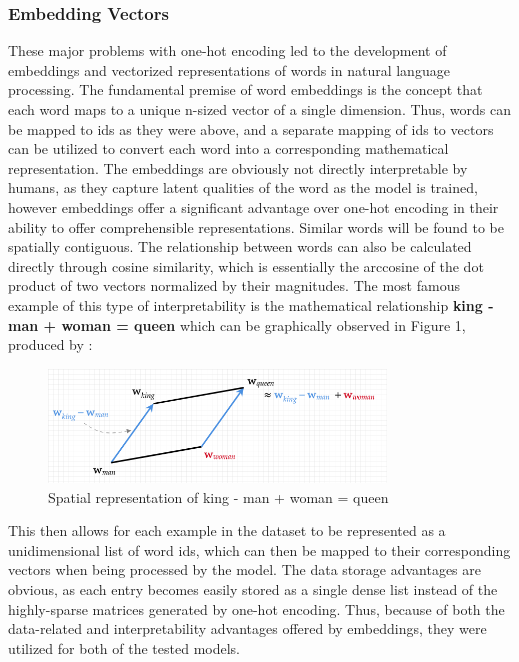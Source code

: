 \subsubsection{Embedding Vectors}
These major problems with one-hot encoding led to the development of embeddings and vectorized representations of words in natural language processing. The fundamental premise of word embeddings is the concept that each word maps to a unique n-sized vector of a single dimension. Thus, words can be mapped to ids as they were above, and a separate mapping of ids to vectors can be utilized to convert each word into a corresponding mathematical representation. The embeddings are obviously not directly interpretable by humans, as they capture latent qualities of the word as the model is trained, however embeddings offer a significant advantage over one-hot encoding in their ability to offer comprehensible representations. Similar words will be found to be spatially contiguous. The relationship between words can also be calculated directly through cosine similarity, which is essentially the arccosine of the dot product of two vectors normalized by their magnitudes. The most famous example of this type of interpretability is the mathematical relationship \textbf{king - man + woman = queen} which can be graphically observed in Figure 1, produced by \textcite{king_man_woman_queen}: 

\begin{figure}[h]
\centering
\includegraphics[width=0.8\textwidth]{fig/king-man-woman-queen.png}
\caption{Spatial representation of king - man + woman = queen}
\label{fig:king_man_woman_queen_pic}
\end{figure}

This then allows for each example in the dataset to be represented as a unidimensional list of word ids, which can then be mapped to their corresponding vectors when being processed by the model. The data storage advantages are obvious, as each entry becomes easily stored as a single dense list instead of the highly-sparse matrices generated by one-hot encoding. Thus, because of both the data-related and interpretability advantages offered by embeddings, they were utilized for both of the tested models.